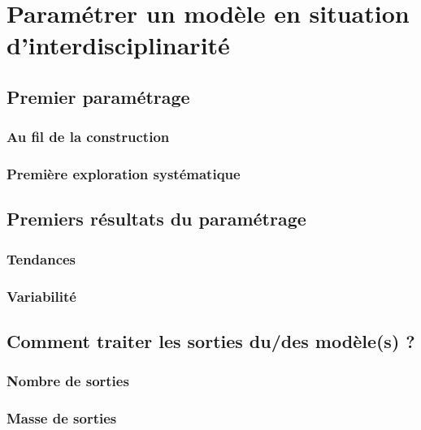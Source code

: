 \documentclass[11pt, a4paper]{book}
\begin{document}
\setcounter{part}{0}
\setcounter{chapter}{2}

\chapter{Paramétrer un modèle en situation d'interdisciplinarité}

\section{Premier paramétrage}

	\subsection{Au fil de la construction}

	\subsection{Première exploration systématique}

\section{Premiers résultats du paramétrage}

	\subsection{Tendances}

	\subsection{Variabilité}

\section{Comment traiter les sorties du/des modèle(s) ?}

	\subsection{Nombre de sorties}

	\subsection{Masse de sorties}
\end{document}
